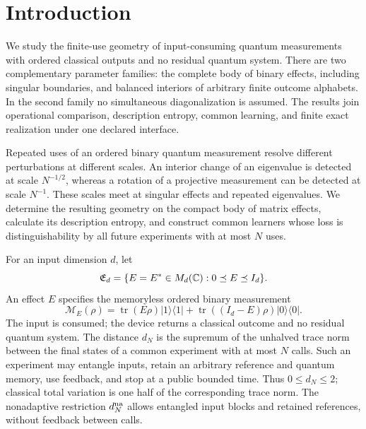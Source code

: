 \section{Introduction}

We study the finite-use geometry of input-consuming quantum
measurements with ordered classical outputs and no residual quantum
system.  There are two complementary parameter families: the complete
body of binary effects, including singular boundaries, and balanced
interiors of arbitrary finite outcome alphabets.  In the second family
no simultaneous diagonalization is assumed.  The results join
operational comparison, description entropy, common learning, and
finite exact realization under one declared interface.

Repeated uses of an ordered binary quantum measurement resolve
different perturbations at different scales.  An interior change of
an eigenvalue is detected at scale $N^{-1/2}$, whereas a rotation of
a projective measurement can be detected at scale $N^{-1}$.  These
scales meet at singular effects and repeated eigenvalues.  We
determine the resulting geometry on the compact body of matrix
effects, calculate its description entropy, and construct common
learners whose loss is distinguishability by all future experiments
with at most $N$ uses.

For an input dimension $d$, let
\[
 \mathfrak E_d=\{E=E^*\in M_d(\mathbb C):0\preceq E\preceq I_d\}.
\]
An effect $E$ specifies the memoryless ordered binary measurement
\[
 \mathcal M_E(\rho)=\operatorname{tr}(E\rho)|1\rangle\langle1|
       +\operatorname{tr}((I_d-E)\rho)|0\rangle\langle0|.
\]
The input is consumed; the device returns a classical outcome and
no residual quantum system.  The distance $d_N$ is the supremum
of the unhalved trace norm between the final states of a common
experiment with at most $N$ calls.  Such an experiment may entangle
inputs, retain an arbitrary reference and quantum memory, use
feedback, and stop at a public bounded time.  Thus $0\le d_N\le2$;
classical total variation is one half of the corresponding trace
norm.  The nonadaptive restriction $d_N^{\rm na}$ allows entangled
input blocks and retained references, without feedback between calls.

